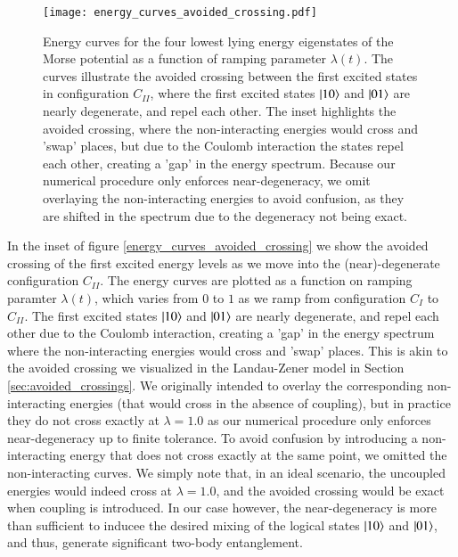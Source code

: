 \documentclass{subfiles}
\begin{document}
\begin{figure}
  \centering
  \texttt{[image: energy\_curves\_avoided\_crossing.pdf]}
  \caption{Energy curves for the four lowest lying energy eigenstates of the Morse potential as a function of ramping parameter $\lambda(t)$. The curves illustrate the avoided crossing between the first excited states in configuration $C_{II}$, where the first excited states $\ket{10}$ and $\ket{01}$ are nearly degenerate, and repel each other. The inset highlights the avoided crossing, where the non-interacting energies would cross and 'swap' places, but due to the Coulomb interaction the states repel each other, creating a 'gap' in the energy spectrum. Because our numerical procedure only enforces near-degeneracy, we omit overlaying the non-interacting energies to avoid confusion, as they are shifted in the spectrum due to the degeneracy not being exact. }
  \label{fig:energy_curves_avoided_crossing}
\end{figure}
In the inset of figure \ref{energy_curves_avoided_crossing} we show the avoided crossing of the first excited energy levels as we move into the (near)-degenerate configuration $C_{II}$. The energy curves are plotted as a function on ramping paramter $\lambda(t)$, which varies from $0$ to $1$ as we ramp from configuration $C_I$ to $C_{II}$. The first excited states $\ket{10}$ and $\ket{01}$ are nearly degenerate, and repel each other due to the Coulomb interaction, creating a 'gap' in the energy spectrum where the non-interacting energies would cross and 'swap' places. This is akin to the avoided crossing we visualized in the Landau-Zener model in Section \ref{sec:avoided_crossings}. We originally intended to overlay the corresponding non-interacting energies (that would cross in the absence of coupling), but in practice they do not cross exactly at $\lambda = 1.0$ as our numerical procedure only enforces near-degeneracy up to finite tolerance. To avoid confusion by introducing a non-interacting energy that does not cross exactly at the same point, we omitted the non-interacting curves. We simply note that, in an ideal scenario, the uncoupled energies would indeed cross at $\lambda = 1.0$, and the avoided crossing would be exact when coupling is introduced. In our case however, the near-degeneracy is more than sufficient to inducee the desired mixing of the logical states $\ket{10}$ and $\ket{01}$, and thus, generate significant two-body entanglement.
\\
\end{document}

